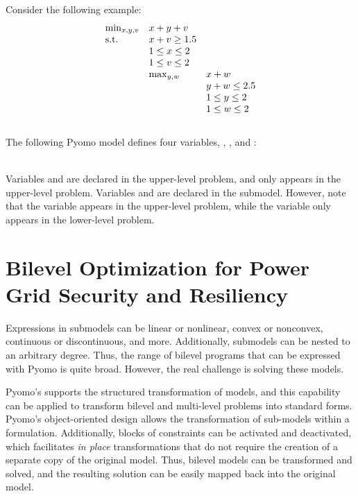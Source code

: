 \documentclass[a4paper,11pt]{article}
\begin{document}
Consider the following example:
\begin{equation}
\begin{array}{lll}
\min_{x, y, v}      & x + y + v & \\
\textrm{s.t.}                 & x + v \geq 1.5 \\
                    & 1 \leq x \leq 2 &\\
                    & 1 \leq v \leq 2 & \\
                    & \max_{y,w}  & x + w\\
                    &           & y + w \leq 2.5 \\
                    &           & 1 \leq y \leq 2\\
                    &           & 1 \leq w \leq 2
\end{array}
\end{equation}\\
The following Pyomo model defines four variables, , ,  and :

\mbox{}\\
Variables  and  are declared in the upper-level
problem, and  only appears in the upper-level problem.
Variables  and  are declared in the submodel.
However, note that the  variable appears in the upper-level
problem, while the  variable only appears in the
lower-level problem.

\section{Bilevel Optimization for Power Grid Security and Resiliency}

Expressions in
submodels can be linear or nonlinear, convex or nonconvex, continuous
or discontinuous, and more.  Additionally, submodels can be nested
to an arbitrary degree.  Thus, the range of bilevel programs that
can be expressed with Pyomo is quite broad.  However, the real
challenge is solving these models.

Pyomo's supports the structured transformation of models, and this
capability can be applied to transform bilevel and multi-level
problems into standard forms.  Pyomo's object-oriented design allows
the transformation of sub-models within a formulation.  Additionally,
blocks of constraints can be activated and deactivated, which
facilitates \textit{in place} transformations that do not require
the creation of a separate copy of the original model.  Thus, bilevel
models can be transformed and solved, and the resulting solution
can be easily mapped back into the original model.
\end{document}
